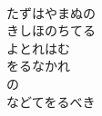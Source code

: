 \documentclass[10pt,b5j]{tarticle} %
\begin{document}
\begin{enumerate}
\begin{minipage}[c]{\blocksize}
        \vspace{\linespace}
        \item~\\
        たずはやまぬの\\
        きしほのちてる\\
        よとれはむ\\
        をるなかれ\\
        の\\
        などてをるべき
    
    \end{minipage}
\end{enumerate} %
\end{document}
